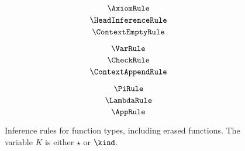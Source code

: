 
\begin{figure}
    \centering
    \begin{minipage}{0.5\textwidth}
        $$\AxiomRule$$
        $$\HeadInferenceRule$$
        $$\ContextEmptyRule$$
    \end{minipage}%
    \begin{minipage}{0.5\textwidth}
        $$\VarRule$$
        $$\CheckRule$$
        $$\ContextAppendRule$$
    \end{minipage}%
    $$\PiRule$$
    $$\LambdaRule$$
    $$\AppRule$$
    \caption{
        Inference rules for function types, including erased functions.
        The variable $K$ is either $\star$ or $\kind$.
    }
\end{figure}
